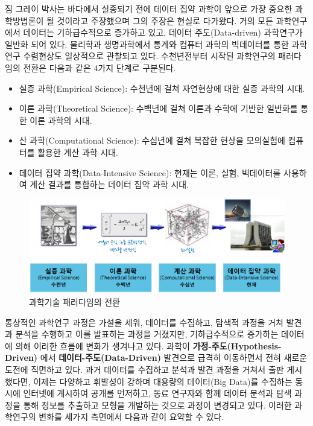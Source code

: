 \documentclass[smallextended]{svjour3}       %
\providecommand{\tightlist}{%
  \setlength{\itemsep}{0pt}\setlength{\parskip}{0pt}}
\begin{document}
짐 그레이 박사는 바다에서 실종되기 전에 데이터 집약
과학\cite{hey2009fourth}이 앞으로 가장 중요한 과학방법론이 될 것이라고
주장했으며 그의 주장은 현실로 다가왔다. 거의 모든 과학연구에서 데이터는
기하급수적으로 증가하고 있고, 데이터 주도(Data-driven) 과학연구가 일반화
되어 있다. 물리학과 생명과학에서 통계와 컴퓨터 과학의 빅데이터를 통한
과학연구 수렴현상도 일상적으로 관찰되고 있다. 수천년전부터 시작된
과학연구의 패러다임의 전환은 다음과 같은 4가지 단계로 구분된다.

\begin{itemize}
\tightlist
\item
  실증 과학(Empirical Science): 수천년에 걸쳐 자연현상에 대한 실증
  과학의 시대.
\item
  이론 과학(Theoretical Science): 수백년에 걸쳐 이론과 수학에 기반한
  일반화를 통한 이론 과학의 시대.
\item
  산 과학(Computational Science): 수십년에 결쳐 복잡한 현상을 모의실험에
  컴퓨터를 활용한 계산 과학 시대.
\item
  데이터 집약 과학(Data-Intensive Science): 현재는 이론, 실험,
  빅데이터를 사용하여 계산 결과를 통합하는 데이터 집약 과학 시대.
\end{itemize}

\begin{figure}

{\centering \includegraphics[width=1\linewidth]{fig/ai-lab-4th-paradigm} 

}

\caption{과학기술 패러다임의 전환}\label{fig:paradigm}
\end{figure}

통상적인 과학연구 과정은 가설을 세워, 데이터를 수집하고, 탐색적 과정을
거쳐 발견과 분석을 수행하고 이를 발표하는 과정을 거졌지만,
기하급수적으로 증가하는 데이터에 의해 이러한 흐름에 변화가 생겨나고
있다. 과학이 \textbf{가정-주도(Hypothesis-Driven)} 에서
\textbf{데이터-주도(Data-Driven)} 발견으로 급격히 이동하면서 전혀 새로운
도전에 직면하고 있다. 과거 데이터를 수집하고 분석과 발견 과정을 거쳐서
출판 게시했다면, 이제는 다양하고 휘발성이 강하며 대용량의 데이터(Big
Data)를 수집하는 동시에 인터넷에 게시하여 공개를 먼저하고, 동료 연구자와
함께 데이터 분석과 탐색 과정을 통해 정보를 추출하고 모형을 개발하는
것으로 과정이 변경되고 있다. 이러한 과학연구의 변화를 세가지 측면에서
다음과 같이 요약할 수 있다.
\end{document}
